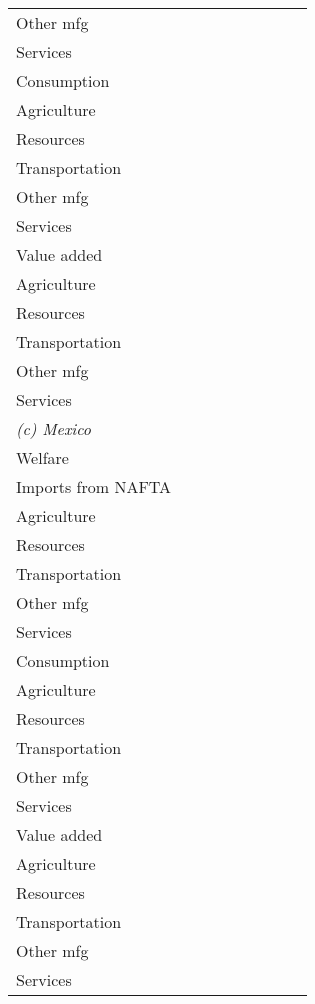 \begin{table}[h!]
\begin{center}
\begin{tabular}{lcccccccc}
\quad Other mfg\\
\quad Services\\
Consumption\\
\quad Agriculture\\
\quad Resources\\
\quad Transportation\\
\quad Other mfg\\
\quad Services\\
Value added\\
\quad Agriculture\\
\quad Resources\\
\quad Transportation\\
\quad Other mfg\\
\quad Services\\
\multicolumn{9}{l}{\textit{(c) Mexico}}\\
Welfare\\
Imports from NAFTA\\
\quad Agriculture\\
\quad Resources\\
\quad Transportation\\
\quad Other mfg\\
\quad Services\\
Consumption\\
\quad Agriculture\\
\quad Resources\\
\quad Transportation\\
\quad Other mfg\\
\quad Services\\
Value added\\
\quad Agriculture\\
\quad Resources\\
\quad Transportation\\
\quad Other mfg\\
\quad Services\\
\bottomrule
\end{tabular}
\end{center}
\normalsize
\end{table}
